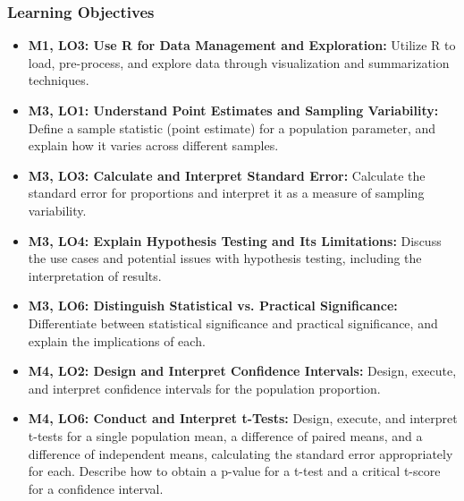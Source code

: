 \begin{frame}
    \frametitle{Learning Objectives}
    \begin{itemize}
        \item \textbf{M1, LO3: Use R for Data Management and Exploration:} Utilize R to load, pre-process, and explore data through visualization and summarization techniques.
        \item \textbf{M3, LO1: Understand Point Estimates and Sampling Variability:} Define a sample statistic (point estimate) for a population parameter, and explain how it varies across different samples.
        \item \textbf{M3, LO3: Calculate and Interpret Standard Error:} Calculate the standard error for proportions and interpret it as a measure of sampling variability.
        \item \textbf{M3, LO4: Explain Hypothesis Testing and Its Limitations:} Discuss the use cases and potential issues with hypothesis testing, including the interpretation of results.
        \item \textbf{M3, LO6: Distinguish Statistical vs. Practical Significance:} Differentiate between statistical significance and practical significance, and explain the implications of each.
        \item \textbf{M4, LO2: Design and Interpret Confidence Intervals:} Design, execute, and interpret confidence intervals for the population proportion.
        \item \textbf{M4, LO6: Conduct and Interpret t-Tests:} Design, execute, and interpret t-tests for a single population mean, a difference of paired means, and a difference of independent means, calculating the standard error appropriately for each. Describe how to obtain a p-value for a t-test and a critical t-score for a confidence interval.
    \end{itemize}
\end{frame}
    
